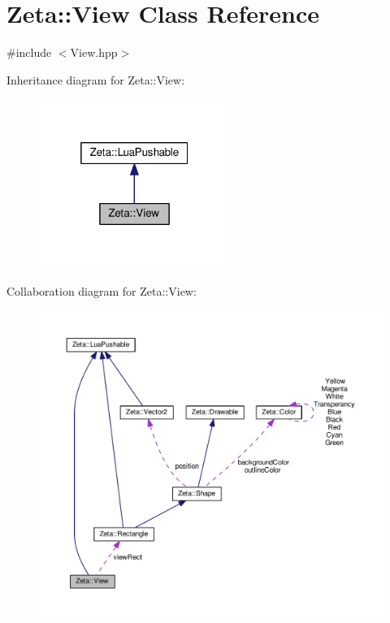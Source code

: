 \hypertarget{classZeta_1_1View}{\section{Zeta\+:\+:View Class Reference}
\label{classZeta_1_1View}
}


{\ttfamily \#include $<$View.\+hpp$>$}



Inheritance diagram for Zeta\+:\+:View\+:\nopagebreak
\begin{figure}[H]
\begin{center}
\leavevmode
\includegraphics[width=176pt]{classZeta_1_1View__inherit__graph}
\end{center}
\end{figure}


Collaboration diagram for Zeta\+:\+:View\+:\nopagebreak
\begin{figure}[H]
\begin{center}
\leavevmode
\includegraphics[width=350pt]{classZeta_1_1View__coll__graph}
\end{center}
\end{figure}
